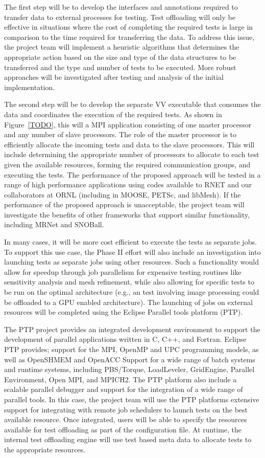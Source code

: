 The first step will be to develop the interfaces and annotations required to transfer data to external processes for testing. Test offloading will only be effective in situations where the cost of completing the required tests is large in comparison to the time required for transferring the data. To address this issue, the project team will implement a heuristic algorithms that determines the appropriate action based on the size and type of the data structures to be transferred and the type and number of tests to be executed. More robust approaches will be investigated after testing and analysis of the initial implementation.  
 
The second step will be to develop the separate VV executable that consumes the data and coordinates the execution of the required tests. As shown in Figure~\ref{TODO}, this will a MPI application consisting of one master processor and any number of slave processors. The role of the master processor is to efficiently allocate the incoming tests and data to the slave processors. This will include determining the appropriate number of processors to allocate to each test given the available resources, forming the required communication groups, and executing the tests. The performance of the proposed approach will be tested in a range of high performance applications using codes available to RNET and our collaborators at ORNL (including in MOOSE, PETSc, and libMesh). If the performance of the proposed approach is unacceptable, the project team will investigate the benefits of other frameworks that support similar functionality, including MRNet and SNOBall. 
 
In many cases, it will be more cost efficient to execute the tests as separate jobs. To support this use case, the Phase II effort will also include an investigation into launching tests as separate jobs using other resources. Such a functionality would allow for speedup through job parallelism for expensive testing routines like sensitivity analysis and mesh refinement, while also allowing for specific tests to be run on the optimal architecture (e.g., an test involving image processing could be offloaded to a GPU enabled architecture). The launching of jobs on external resources will be completed using the Eclipse Parallel tools platform (PTP). 

The PTP project provides an integrated development environment to support the development of parallel applications written in C, C++, and Fortran. Eclipse PTP provides; support for the MPI, OpenMP and UPC programming models, as well as OpenSHMEM and OpenACC Support for a wide range of batch systems and runtime systems, including PBS/Torque, LoadLeveler, GridEngine, Parallel Environment, Open MPI, and MPICH2. The PTP platform also include a scalable parallel debugger  and support for the integration of a wide range of parallel tools. In this case, the project team will use the PTP platforms extensive support for integrating with remote job schedulers to launch tests on the best available resource. Once integrated, users will be able to specify the resources available for test offloading as part of the configuration file. At runtime, the internal test offloading engine will use test based meta data to allocate tests to the appropriate resources.  
 
